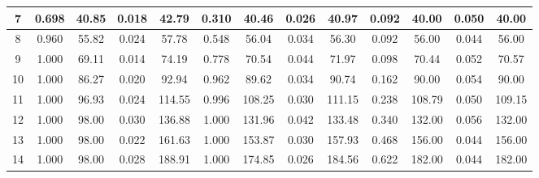 \documentclass[12pt]{article}
\numberwithin{equation}{section}
\numberwithin{table}{section}
\numberwithin{thm}{section}
\numberwithin{defn}{section}
\numberwithin{lem}{section}
\numberwithin{prop}{section}
\numberwithin{cor}{section}
\numberwithin{rem}{section}
\begin{document}
\begin{sidewaystable}[htbp]
\begin{tabular}{|c|cccc|cccc|cccc|}
7 & \multicolumn{1}{c|}{0.698} & \multicolumn{1}{c|}{40.85} & \multicolumn{1}{c|}{0.018} & 42.79 & \multicolumn{1}{c|}{0.310} & \multicolumn{1}{c|}{40.46} & \multicolumn{1}{c|}{0.026} & 40.97 & \multicolumn{1}{c|}{0.092} & \multicolumn{1}{c|}{40.00} & \multicolumn{1}{c|}{0.050} & 40.00 \\ \hline
8 & \multicolumn{1}{c|}{0.960} & \multicolumn{1}{c|}{55.82} & \multicolumn{1}{c|}{0.024} & 57.78 & \multicolumn{1}{c|}{0.548} & \multicolumn{1}{c|}{56.04} & \multicolumn{1}{c|}{0.034} & 56.30 & \multicolumn{1}{c|}{0.092} & \multicolumn{1}{c|}{56.00} & \multicolumn{1}{c|}{0.044} & 56.00 \\ \hline
9 & \multicolumn{1}{c|}{1.000} & \multicolumn{1}{c|}{69.11} & \multicolumn{1}{c|}{0.014} & 74.19 & \multicolumn{1}{c|}{0.778} & \multicolumn{1}{c|}{70.54} & \multicolumn{1}{c|}{0.044} & 71.97 & \multicolumn{1}{c|}{0.098} & \multicolumn{1}{c|}{70.44} & \multicolumn{1}{c|}{0.052} & 70.57 \\ \hline
10 & \multicolumn{1}{c|}{1.000} & \multicolumn{1}{c|}{86.27} & \multicolumn{1}{c|}{0.020} & 92.94 & \multicolumn{1}{c|}{0.962} & \multicolumn{1}{c|}{89.62} & \multicolumn{1}{c|}{0.034} & 90.74 & \multicolumn{1}{c|}{0.162} & \multicolumn{1}{c|}{90.00} & \multicolumn{1}{c|}{0.054} & 90.00 \\ \hline
11 & \multicolumn{1}{c|}{1.000} & \multicolumn{1}{c|}{96.93} & \multicolumn{1}{c|}{0.024} & 114.55 & \multicolumn{1}{c|}{0.996} & \multicolumn{1}{c|}{108.25} & \multicolumn{1}{c|}{0.030} & 111.15 & \multicolumn{1}{c|}{0.238} & \multicolumn{1}{c|}{108.79} & \multicolumn{1}{c|}{0.050} & 109.15 \\ \hline
12 & \multicolumn{1}{c|}{1.000} & \multicolumn{1}{c|}{98.00} & \multicolumn{1}{c|}{0.030} & 136.88 & \multicolumn{1}{c|}{1.000} & \multicolumn{1}{c|}{131.96} & \multicolumn{1}{c|}{0.042} & 133.48 & \multicolumn{1}{c|}{0.340} & \multicolumn{1}{c|}{132.00} & \multicolumn{1}{c|}{0.056} & 132.00 \\ \hline
13 & \multicolumn{1}{c|}{1.000} & \multicolumn{1}{c|}{98.00} & \multicolumn{1}{c|}{0.022} & 161.63 & \multicolumn{1}{c|}{1.000} & \multicolumn{1}{c|}{153.87} & \multicolumn{1}{c|}{0.030} & 157.93 & \multicolumn{1}{c|}{0.468} & \multicolumn{1}{c|}{156.00} & \multicolumn{1}{c|}{0.044} & 156.00 \\ \hline
14 & \multicolumn{1}{c|}{1.000} & \multicolumn{1}{c|}{98.00} & \multicolumn{1}{c|}{0.028} & 188.91 & \multicolumn{1}{c|}{1.000} & \multicolumn{1}{c|}{174.85} & \multicolumn{1}{c|}{0.026} & 184.56 & \multicolumn{1}{c|}{0.622} & \multicolumn{1}{c|}{182.00} & \multicolumn{1}{c|}{0.044} & 182.00 \\ \hline

\end{tabular}
\end{sidewaystable}
\end{document}
